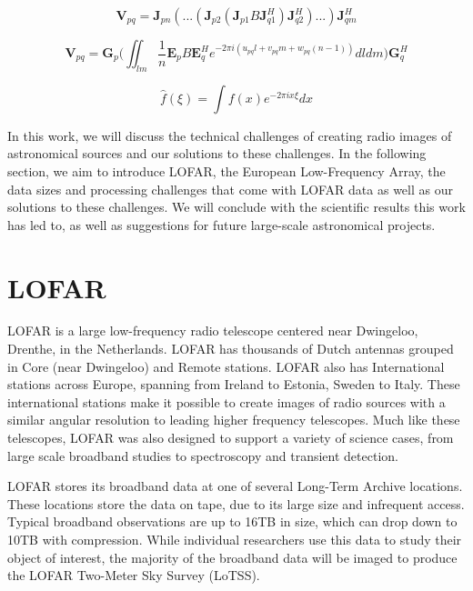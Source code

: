 \begin{equation}
    \bm{V}_{pq} = \bm{J}_{pn}(...(\bm{J}_{p2}(\bm{J}_{p1}B\bm{J}^H_{q1})\bm{J}^H_{q2})...)\bm{J}^H_{qm}
    \label{eq:RIME1}
\end{equation}


\begin{equation}
    \bm{V}_{pq} = \bm{G}_p \Bigg( \iint_{\mathit{lm}}\frac{1}{n} \bm{E}_p B \bm{E}^H_q e^{-2\pi i (u_{pq}l+v_{pq}m+w_{pq}(n-1))} d\mathit{l}d\mathit{m}\Bigg) \bm{G}^H_q
    \label{eq:RIME2}
\end{equation}


\begin{equation}
    \hat f(\xi) = \int f(x) e^{-2\pi i x \xi} dx 
    \label{eq:fourier}
\end{equation}

In this work, we will discuss the technical challenges of creating radio images of astronomical sources and our solutions to these challenges. In the following section, we aim to introduce LOFAR, the European Low-Frequency Array, the data sizes and processing challenges that come with LOFAR data as well as our solutions to these challenges. We will conclude with the scientific results this work has led to, as well as suggestions for future large-scale astronomical projects.

\section{LOFAR}

\Gls{LOFAR} is a large low-frequency radio telescope centered near Dwingeloo, Drenthe, in the Netherlands. LOFAR has thousands of Dutch antennas grouped in Core (near Dwingeloo) and Remote stations. LOFAR also has International stations across Europe, spanning from Ireland to Estonia, Sweden to Italy. These international stations make it possible to create images of radio sources with a similar angular resolution to leading higher frequency telescopes. Much like these telescopes, LOFAR was also designed to support a variety of science cases, from large scale broadband studies to spectroscopy and transient detection. 

LOFAR stores its broadband data at one of several Long-Term Archive locations. These locations store the data on tape, due to its large size and infrequent access. Typical broadband observations are up to 16TB in size, which can drop down to 10TB with compression. While individual researchers use this data to study their object of interest, the majority of the broadband data will be imaged to produce the LOFAR Two-Meter Sky Survey (LoTSS). 


